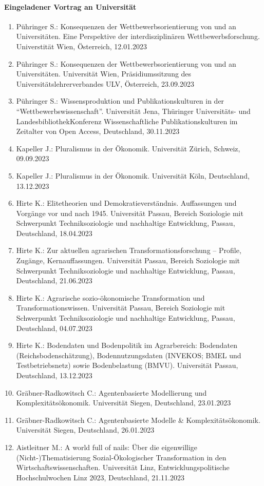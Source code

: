 \paragraph{Eingeladener Vortrag an Universität}
\begin{enumerate}
	\item Pühringer S.: Konsequenzen der Wettbewerbsorientierung von und an Universitäten. Eine Perspektive der interdisziplinären Wettbewerbsforschung. Universtität Wien, Österreich, 12.01.2023
	\item Pühringer S.: Konsequenzen der Wettbewerbsorientierung von und an Universitäten. Universität Wien, Präsidiumssitzung des Universitätslehrerverbandes ULV, Österreich, 23.09.2023
	\item Pühringer S.: Wissensproduktion und Publikationskulturen in der “Wettbewerbswissenschaft”. Universität Jena, Thüringer Universitäts- und LandesbibliothekKonferenz Wissenschaftliche Publikationskulturen im Zeitalter von Open Access, Deutschland, 30.11.2023
	\item Kapeller J.: Pluralismus in der Ökonomik. Universität Zürich, Schweiz, 09.09.2023
	\item Kapeller J.: Pluralismus in der Ökonomik. Universität Köln, Deutschland, 13.12.2023
	\item Hirte K.: Elitetheorien und Demokratieverständnis. Auffassungen und Vorgänge vor und nach 1945. Universität Passau, Bereich Soziologie mit Schwerpunkt Techniksoziologie und nachhaltige Entwicklung, Passau, Deutschland, 18.04.2023
	\item Hirte K.: Zur aktuellen agrarischen Transformationsforschung – Profile, Zugänge, Kernauffassungen. Universität Passau, Bereich Soziologie mit Schwerpunkt Techniksoziologie und nachhaltige Entwicklung, Passau, Deutschland, 21.06.2023
	\item Hirte K.: Agrarische sozio-ökonomische Transformation und Transformationswissen. Universität Passau, Bereich Soziologie mit Schwerpunkt Techniksoziologie und nachhaltige Entwicklung, Passau, Deutschland, 04.07.2023
	\item Hirte K.: Bodendaten und Bodenpolitik im Agrarbereich: Bodendaten (Reichsbodenschätzung), Bodennutzungsdaten (INVEKOS; BMEL und Testbetriebsnetz) sowie Bodenbelastung (BMVU). Universität Passau, Deutschland, 13.12.2023
	\item Gräbner-Radkowitsch C.: Agentenbasierte Modellierung und Komplexitätsökonomik. Universität Siegen, Deutschland, 23.01.2023
	\item Gräbner-Radkowitsch C.: Agentenbasierte Modelle \& Komplexitätsökonomik. Universität Siegen, Deutschland, 26.01.2023
	\item Aistleitner M.: A world full of nails: Über die eigenwillige (Nicht-)Thematisierung Sozial-Ökologischer Transformation in den Wirtschaftswissenschaften. Universität Linz, Entwicklungspolitische Hochschulwochen Linz 2023, Deutschland, 21.11.2023
\end{enumerate}
